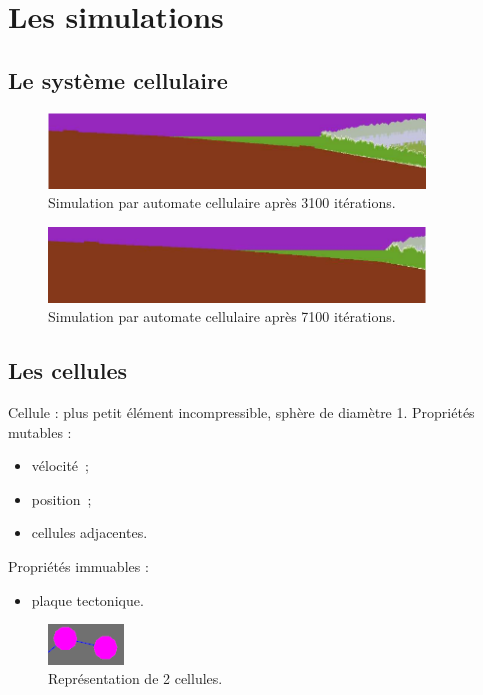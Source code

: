 \documentclass{beamer}
\begin{document}
\section{Les simulations}
\subsection{Le système cellulaire}
\begin{frame}
  \begin{center}
    \begin{figure}
      \includegraphics[width=10cm]{Images/3100_cell.png}
      \caption{Simulation par automate cellulaire après 3100 itérations.}
    \end{figure}
    \begin{figure}
      \includegraphics[width=10cm]{Images/7100_cell.png}
      \caption{Simulation par automate cellulaire après 7100 itérations.}
    \end{figure}
  \end{center}
\end{frame}

\subsection{Les cellules}
\begin{frame}
  Cellule : plus petit élément incompressible, sphère de diamètre 1. \smallbreak
  Propriétés mutables :
  \begin{itemize}
   \item vélocité~;
   \item position~;
   \item cellules adjacentes.
  \end{itemize}
  Propriétés immuables :
  \begin{itemize}
   \item plaque tectonique.
  \end{itemize}
  \begin{figure}
    \begin{center}
      \includegraphics[width=2cm]{Images/cellule.png}
    \end{center}
    \caption{Représentation de 2 cellules.}
  \end{figure}
\end{frame}
\end{document}
